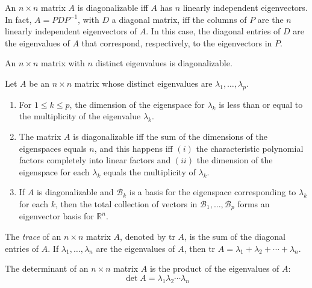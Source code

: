 \documentclass{article}
\begin{document}
\begin{thm} 
    An \(n\times n\) matrix \(A\) is diagonalizable iff \(A\) has \(n\) linearly independent eigenvectors. In fact, \(A=PDP^{-1}\), with \(D\) a diagonal matrix, iff the columns of \(P\) are the \(n\) linearly independent eigenvectors of \(A\). In this case, the diagonal entries of \(D\) are the eigenvalues of \(A\) that correspond, respectively, to the eigenvectors in \(P\).
\end{thm}

\begin{thm}
    An \(n\times n\) matrix with \(n\) distinct eigenvalues is diagonalizable.
\end{thm}

\begin{thm}
    Let \(A\) be an \(n\times n\) matrix whose distinct eigenvalues are \(\lambda_1,\ldots,\lambda_p\).
    \begin{enumerate}
        \item[a.] For \(1\leq k\leq p\), the dimension of the eigenspace for \(\lambda_k\) is less than or equal to the multiplicity of the eigenvalue \(\lambda_k\).
        \item[b.] The matrix \(A\) is diagonalizable iff the sum of the dimensions of the eigenspaces equals \(n\), and this happens iff \((i)\) the characteristic polynomial factors completely into linear factors and \((ii)\) the dimension of the eigenspace for each \(\lambda_k\) equals the multiplicity of \(\lambda_k\).
        \item[c.] If \(A\) is diagonalizable and \(\mathcal{B}_k\) is a basis for the eigenspace corresponding to \(\lambda_k\) for each \(k\), then the total collection of vectors in \(\mathcal{B}_1,\ldots,\mathcal{B}_p\) forms an eigenvector basis for \(\mathbb{R}^n\).
    \end{enumerate}
\end{thm}

\begin{rem}
    The \emph{trace} of an \(n\times n\) matrix \(A\), denoted by \(\text{tr }A\), is the sum of the diagonal entries of \(A\). If \(\lambda_1,\ldots,\lambda_n\) are the eigenvalues of \(A\), then \(\text{tr }A=\lambda_1+\lambda_2+\cdots+\lambda_n\).
\end{rem}

\begin{rem}
    The determinant of an \(n\times n\) matrix \(A\) is the product of the eigenvalues of \(A\): \[\det A=\lambda_1\lambda_2\cdots\lambda_n\]
\end{rem}
\end{document}
